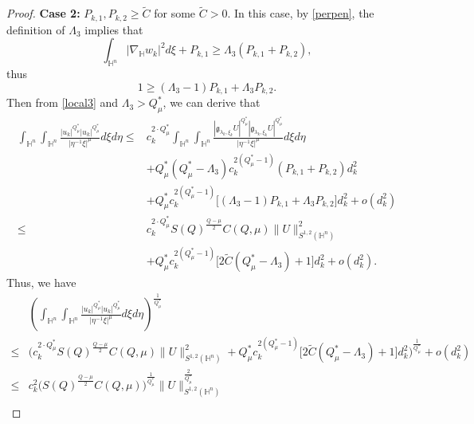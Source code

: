 \documentclass[11pt]{article}
\begin{document}
\begin{proof}
    \textbf{Case 2:} $P_{k,1},P_{k,2}\geq \widetilde{C}$ for some $\widetilde{C}>0$. In this case, by \eqref{perpen},
 the definition of $\Lambda_3$ implies that
    \begin{equation*}
    \int_{\mathbb{H}^{n}}|\nabla_{\mathbb{H}} w_k|^{2}{d}\xi+P_{k,1}\geq \Lambda_3(P_{k,1}+P_{k,2}),
    \end{equation*}
    thus
    \begin{equation*}
    1\geq (\Lambda_3-1)P_{k,1}+\Lambda_3 P_{k,2}.
    \end{equation*}
    Then from \eqref{local3} and $\Lambda_3>Q_\mu^*$, we can derive that
    \begin{align*}%
    \int_{\mathbb{H}^{n}}\int_{\mathbb{H}^{n}}\frac{|u_k|^{Q^{\ast}_{\mu}}|u_k|
^{Q^{\ast}_{\mu}}}{|\eta^{-1}\xi|^{\mu}}{d}\xi{d}\eta
  \leq &c_k^{2\cdot Q_{\mu}^{\ast}} \int_{\mathbb{H}^{n}}\int_{\mathbb{H}^{n}}\frac{|\mathfrak{g}_{\lambda_k,\xi_k}U|^{Q^{\ast}_{\mu}}|\mathfrak{g}_{\lambda_k,\xi_k}U|
^{Q^{\ast}_{\mu}}}{|\eta^{-1}\xi|^{\mu}}{d}\xi{d}\eta \nonumber\\
&+Q_{\mu}^{\ast}(Q_{\mu}^{\ast}-\Lambda_3)c_k^{2(Q_{\mu}^{\ast}-1)} (P_{k,1}+P_{k,2})d_k^2\\
&+Q_{\mu}^{\ast}c_k^{2(Q_{\mu}^{\ast}-1)} \big[(\Lambda_3-1)P_{k,1}+\Lambda_3P_{k,2}\big]d_k^2+ o(d_k^2)\\
\leq& c_k^{2\cdot Q_{\mu}^{\ast}} S(Q)^{\frac{Q-\mu}{2}}C(Q,\mu)\|U\|^2_{S^{1,2}(\mathbb{H}^{n})}\\
&+Q_{\mu}^{\ast}c_k^{2(Q_{\mu}^{\ast}-1)}
\big[2\widetilde{C}(Q_{\mu}^{\ast}-\Lambda_3)+1\big]d_k^2+o(d_k^2).
    \end{align*}
    Thus, we have
    \begin{align*}
      &\left(\int_{\mathbb{H}^{n}}\int_{\mathbb{H}^{n}}\frac{|u_k|^{Q^{\ast}_{\mu}}|u_k|
^{Q^{\ast}_{\mu}}}{|\eta^{-1}\xi|^{\mu}}{d}\xi{d}\eta\right)^{\frac{1}{Q_\mu^*}}\\
\leq& \bigg(c_k^{2\cdot Q_{\mu}^{\ast}}  S(Q)^{\frac{Q-\mu}{2}}C(Q,\mu) \|U\|^2_{S^{1,2}(\mathbb{H}^{n})}+Q_{\mu}^{\ast}c_k^{2(Q_{\mu}^{\ast}-1)}
\big[2\widetilde{C}(Q_{\mu}^{\ast}-\Lambda_3)+1\big]d_k^2\bigg)^{\frac{1}{Q_\mu^*}}+o(d_k^2)\\
\leq& c_k^{2} \Big( S(Q)^{\frac{Q-\mu}{2}}C(Q,\mu) \Big)^{\frac{1}{Q_\mu^*}}\|U\|^{\frac{2}{Q_\mu^*}}_{S^{1,2}(\mathbb{H}^{n})}\\

\end{align*}
\end{proof}
\end{document}
